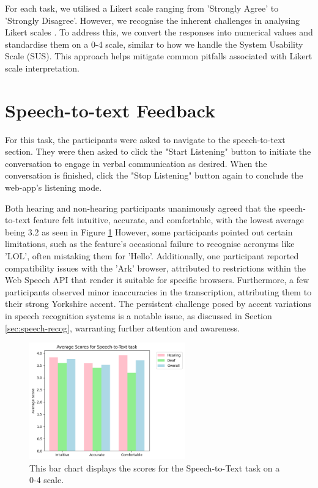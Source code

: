 \documentclass{l4proj}
\begin{document}
For each task, we utilised a Likert scale ranging from 'Strongly Agree' to 'Strongly Disagree'. However, we recognise the inherent challenges in analysing Likert scales \citep{harpe2015analyze, likert}. To address this, we convert the responses into numerical values and standardise them on a 0-4 scale, similar to how we handle the System Usability Scale (SUS). This approach helps mitigate common pitfalls associated with Likert scale interpretation.

\section{Speech-to-text Feedback}

For this task, the participants were asked to navigate to the speech-to-text section. They were then asked to click the "Start Listening" button to initiate the conversation to engage in verbal communication as desired. When the conversation is finished, click the "Stop Listening" button again to conclude the web-app's listening mode.

Both hearing and non-hearing participants unanimously agreed that the speech-to-text feature felt intuitive, accurate, and comfortable, with the lowest average being 3.2 as seen in Figure \ref{fig:STT-chart} However, some participants pointed out certain limitations, such as the feature's occasional failure to recognise acronyms like 'LOL', often mistaking them for 'Hello'. Additionally, one participant reported compatibility issues with the 'Ark' browser, attributed to restrictions within the Web Speech API that render it suitable for specific browsers. Furthermore, a few participants observed minor inaccuracies in the transcription, attributing them to their strong Yorkshire accent. The persistent challenge posed by accent variations in speech recognition systems is a notable issue, as discussed in Section \ref{sec:speech-recog}, warranting further attention and awareness.

\begin{figure}
    \centering
    \includegraphics[width=0.6\textwidth]{dissertation/images/STT.png}
    \caption{This bar chart displays the scores for the Speech-to-Text task on a 0-4 scale.}
    \label{fig:STT-chart}
\end{figure}
\end{document}
